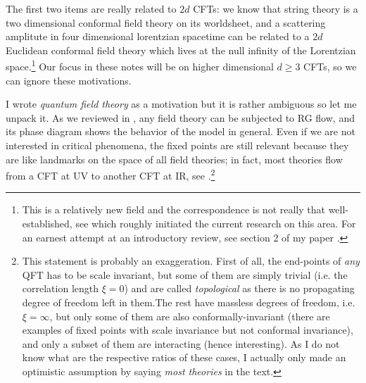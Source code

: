 \documentclass[12pt]{article}
\numberwithin{equation}{section}
\begin{document}
The first two items are really related to $2d$ CFTs: we know that string theory is a two dimensional conformal field theory on its worldsheet, and a scattering amplitute in four dimensional lorentzian spacetime can be related to a $2d$ Euclidean conformal field theory which lives at the null infinity of the Lorentzian space.\footnote{
This is a relatively new field and the correspondence is not really that well-established, see \cite{Pasterski:2016qvg} which roughly initiated the current research on this area. For an earnest attempt at an introductory review, see section 2 of my paper \cite{Albayrak:2020saa}.
} Our focus in these notes will be on higher dimensional $d\ge 3$ CFTs, so we can ignore these motivations.

I wrote \emph{quantum field theory} as a motivation but it is rather ambiguous so let me unpack it. As we reviewed in \secref{\ref{sec: review of RG}}, any field theory can be subjected to RG flow, and its phase diagram shows the behavior of the model in general. Even if we are not interested in critical phenomena, the fixed points are still relevant because they are like landmarks on the space of all field theories; in fact, most theories flow from a CFT at UV to another CFT at IR, see \figref{\ref{fig: UV completion}}.\footnote{This statement is probably an exaggeration. First of all, the end-points of \emph{any} QFT has to be scale invariant, but some of them are simply trivial (i.e. the correlation length $\xi=0$) and are called \emph{topological} as there is no propagating degree of freedom left in them.\footnotemark The rest have massless degrees of freedom, i.e. $\xi=\infty$, but only some of them are also conformally-invariant (there are examples of fixed points with scale invariance but not conformal invariance), and only a subset of them are interacting (hence interesting). As I do not know what are the respective ratios of these cases, I actually only made an optimistic assumption by saying \emph{most theories} in the text.}  
\end{document}

